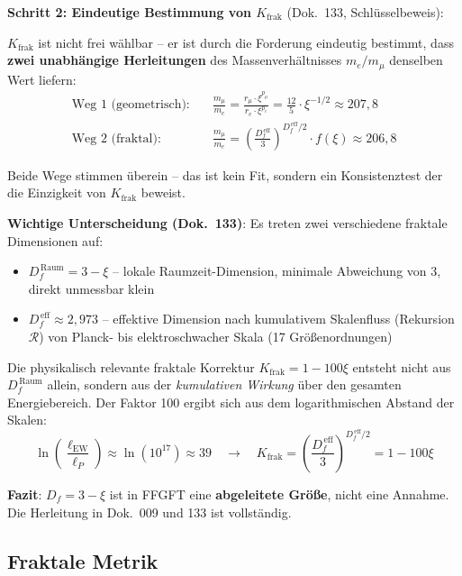 \textbf{Schritt 2: Eindeutige Bestimmung von $K_{\text{frak}}$}
(Dok.~133, Schlüsselbeweis):

$K_{\text{frak}}$ ist nicht frei wählbar -- er ist durch die Forderung
eindeutig bestimmt, dass \textbf{zwei unabhängige Herleitungen} des
Massenverhältnisses $m_e/m_\mu$ denselben Wert liefern:
\begin{align}
    \text{Weg 1 (geometrisch):} &\quad
    \frac{m_\mu}{m_e} = \frac{r_\mu \cdot \xi^{p_\mu}}{r_e \cdot \xi^{p_e}}
    = \frac{12}{5} \cdot \xi^{-1/2} \approx 207{,}8 \\
    \text{Weg 2 (fraktal):} &\quad
    \frac{m_\mu}{m_e} = \left(\frac{D_f^{\,\text{eff}}}{3}\right)^{\!D_f^{\,\text{eff}}/2}
    \cdot f(\xi) \approx 206{,}8
\end{align}

Beide Wege stimmen überein -- das ist kein Fit, sondern ein
Konsistenztest der die Einzigkeit von $K_{\text{frak}}$ beweist.

\textbf{Wichtige Unterscheidung (Dok.~133)}: Es treten zwei
verschiedene fraktale Dimensionen auf:
\begin{itemize}
    \item $D_f^{\,\text{Raum}} = 3 - \xi$ -- lokale Raumzeit-Dimension,
          minimale Abweichung von 3, direkt unmessbar klein
    \item $D_f^{\,\text{eff}} \approx 2{,}973$ -- effektive Dimension
          nach kumulativem Skalenfluss (Rekursion $\mathcal{R}$) von Planck- bis
          elektroschwacher Skala (17 Größenordnungen)
\end{itemize}

Die physikalisch relevante fraktale Korrektur $K_{\text{frak}} = 1 - 100\xi$
entsteht nicht aus $D_f^{\,\text{Raum}}$ allein, sondern aus der
\emph{kumulativen Wirkung} über den gesamten Energiebereich. Der
Faktor 100 ergibt sich aus dem logarithmischen Abstand der Skalen:
\begin{equation}
    \ln\!\left(\frac{\ell_{\text{EW}}}{\ell_P}\right)
    \approx \ln\!\left(10^{17}\right)
    \approx 39 \quad \longrightarrow \quad
    K_{\text{frak}} = \left(\frac{D_f^{\,\text{eff}}}{3}\right)^{\!D_f^{\,\text{eff}}/2}
    = 1 - 100\xi
\end{equation}

\textbf{Fazit}: $D_f = 3 - \xi$ ist in FFGFT eine
\textbf{abgeleitete Größe}, nicht eine Annahme. Die Herleitung
in Dok.~009 und 133 ist vollständig.

\subsection{Fraktale Metrik}

